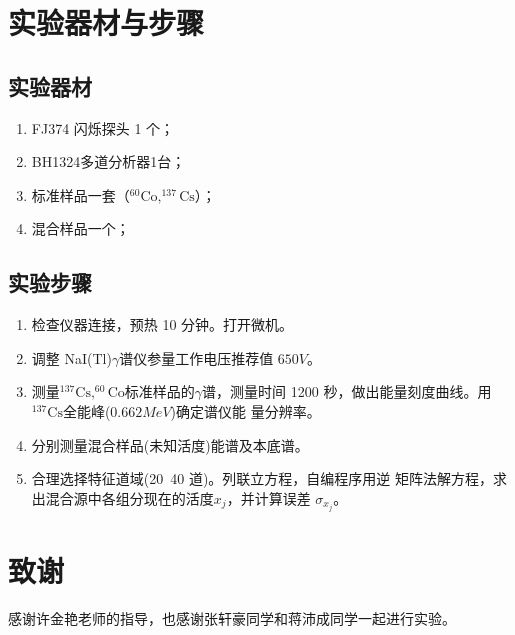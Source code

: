 \documentclass{article}
\begin{document}
    \section{实验器材与步骤}
    \subsection{实验器材}
    \begin{enumerate}
        \item FJ374 闪烁探头 1 个；
        \item BH1324多道分析器1台；
        \item 标准样品一套（$^{60}\text{Co},^{137}\text{Cs}$）；
        \item 混合样品一个；
    \end{enumerate}
    \subsection{实验步骤}
    \begin{enumerate}
        \item 检查仪器连接，预热 10 分钟。打开微机。
        \item 调整 NaI(Tl)$\gamma$谱仪参量工作电压推荐值 $650\si{V}$。
        \item 测量$^{137}\text{Cs}, ^{60}\text{Co}$标准样品的$\gamma$谱，测量时间 1200 秒，做出能量刻度曲线。用$^{137}\text{Cs}$全能峰($0.662\si{MeV}$)确定谱仪能 量分辨率。
        \item 分别测量混合样品(未知活度)能谱及本底谱。
        \item 合理选择特征道域(20~40 道)。列联立方程，自编程序用逆 矩阵法解方程，求出混合源中各组分现在的活度$x_j$，并计算误差
        $\sigma_{x_j}$。
    \end{enumerate}

\section{致谢}
    感谢许金艳老师的指导，也感谢张轩豪同学和蒋沛成同学一起进行实验。 
    \clearpage
    \appendix
    \appendixpage
\end{document}
